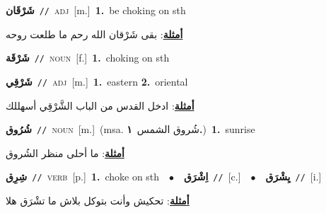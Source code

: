 \documentclass[10pt,a4paper,twoside]{article} %
\begin{document}
\begin{multicols}{2}
{\setlength\topsep{0pt}\textbf{\foreignlanguage{arabic}{شَرْقَان}}\ {\color{gray}\texttt{//}\color{black}}\ \textsc{adj}\ [m.]\ \textbf{1.}~be choking on sth\  \begin{flushright}\color{gray}\foreignlanguage{arabic}{\textbf{\underline{\foreignlanguage{arabic}{أمثلة}}}: بقى شَرْقان الله رحم ما طلعت روحه}\end{flushright}\color{black}} \vspace{2mm}

{\setlength\topsep{0pt}\textbf{\foreignlanguage{arabic}{شَرْقَة}}\ {\color{gray}\texttt{//}\color{black}}\ \textsc{noun}\ [f.]\ \textbf{1.}~choking on sth\ } \vspace{2mm}

{\setlength\topsep{0pt}\textbf{\foreignlanguage{arabic}{شَرْقِي}}\ {\color{gray}\texttt{//}\color{black}}\ \textsc{adj}\ [m.]\ \textbf{1.}~eastern  \textbf{2.}~oriental\  \begin{flushright}\color{gray}\foreignlanguage{arabic}{\textbf{\underline{\foreignlanguage{arabic}{أمثلة}}}: ادخل القدس من الباب الشَّرْقِي أسهللك}\end{flushright}\color{black}} \vspace{2mm}

{\setlength\topsep{0pt}\textbf{\foreignlanguage{arabic}{شُرُوق}}\ {\color{gray}\texttt{//}\color{black}}\ \textsc{noun}\ [m.]\ \color{gray}(msa. \foreignlanguage{arabic}{شُروق الشمس}~\foreignlanguage{arabic}{\textbf{١.}})\color{black}\ \textbf{1.}~sunrise\  \begin{flushright}\color{gray}\foreignlanguage{arabic}{\textbf{\underline{\foreignlanguage{arabic}{أمثلة}}}: ما أحلى منظر الشُروق}\end{flushright}\color{black}} \vspace{2mm}

{\setlength\topsep{0pt}\textbf{\foreignlanguage{arabic}{شِرِق}}\ {\color{gray}\texttt{//}\color{black}}\ \textsc{verb}\ [p.]\ \textbf{1.}~choke on sth\ \ $\bullet$\ \ \setlength\topsep{0pt}\textbf{\foreignlanguage{arabic}{اِشْرَق}}\ {\color{gray}\texttt{//}\color{black}}\ [c.]\ \ $\bullet$\ \ \setlength\topsep{0pt}\textbf{\foreignlanguage{arabic}{يِشْرَق}}\ {\color{gray}\texttt{//}\color{black}}\ [i.]\  \begin{flushright}\color{gray}\foreignlanguage{arabic}{\textbf{\underline{\foreignlanguage{arabic}{أمثلة}}}: تحكيش وأنت بتوكل بلاش ما تشْرَق هلا}\end{flushright}\color{black}} \vspace{2mm}


\end{multicols}
\end{document}
